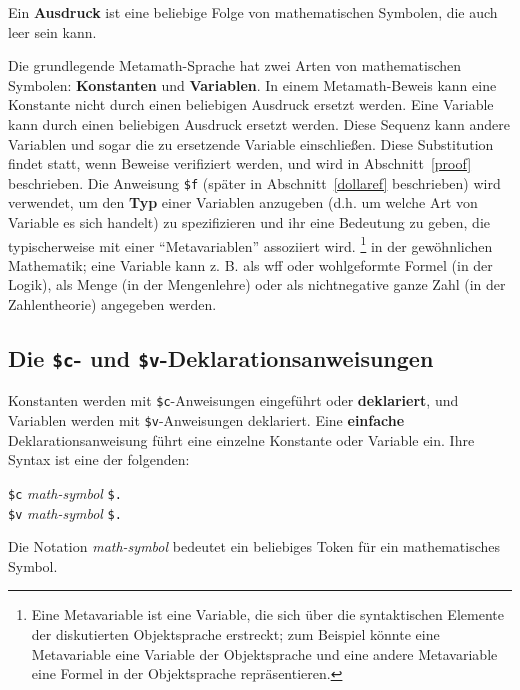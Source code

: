 Ein {\bf Ausdruck} ist eine beliebige Folge von mathematischen Symbolen, die auch leer sein kann.

Die grundlegende Metamath-Sprache hat zwei Arten von mathematischen Symbolen:  {\bf Konstanten} und {\bf Variablen}.  In einem Metamath-Beweis kann eine Konstante nicht durch einen beliebigen Ausdruck ersetzt werden.  Eine Variable kann durch einen beliebigen Ausdruck ersetzt werden.  Diese Sequenz kann andere Variablen und sogar die zu ersetzende Variable einschließen.  Diese Substitution findet statt, wenn Beweise verifiziert werden, und wird in Abschnitt~\ref{proof} beschrieben.  Die Anweisung \texttt{\$f} (später in Abschnitt~\ref{dollaref} beschrieben) wird verwendet, um den {\bf Typ} einer Variablen anzugeben (d.h. um welche Art von Variable es sich handelt) zu spezifizieren und ihr eine Bedeutung zu geben, die typischerweise mit einer "`Metavariablen"' assoziiert wird. \footnote{Eine Metavariable ist eine Variable, die sich über die syntaktischen Elemente der diskutierten Objektsprache erstreckt; zum Beispiel könnte eine Metavariable eine Variable der Objektsprache und eine andere Metavariable eine Formel in der Objektsprache repräsentieren. } in der gewöhnlichen Mathematik; eine Variable kann z. B. als wff oder wohlgeformte Formel (in der Logik), als Menge (in der Mengenlehre) oder als nichtnegative ganze Zahl (in der Zahlentheorie) angegeben werden.

\subsection{Die \texttt{\$c}- und \texttt{\$v}-Deklarationsanweisungen}

Konstanten werden mit \texttt{\$c}-Anweisungen eingeführt oder {\bf deklariert}, und Variablen werden mit \texttt{\$v}-Anweisungen deklariert.  Eine {\bf einfache} Deklarationsanweisung führt eine einzelne Konstante oder Variable ein.  Ihre Syntax ist eine der folgenden:
\begin{center}
  \texttt{\$c} {\em math-symbol} \texttt{\$.}\\
  \texttt{\$v} {\em math-symbol} \texttt{\$.}
\end{center}
Die Notation {\em math-symbol} bedeutet ein beliebiges  Token für ein mathe\-ma\-tisches Symbol.

